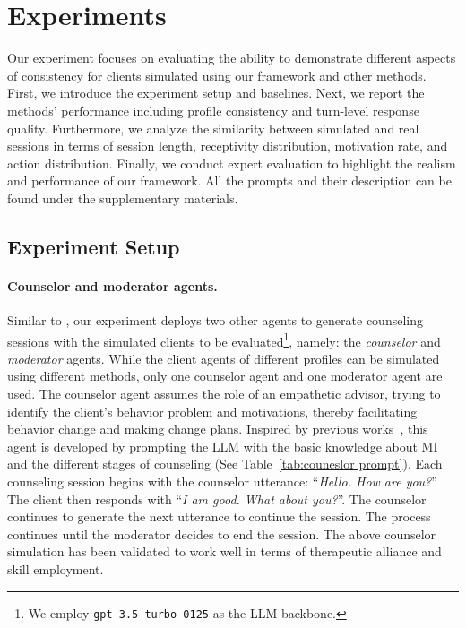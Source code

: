\section{Experiments}
\label{sec:experiments}

Our experiment focuses on evaluating the ability to demonstrate different aspects of consistency for clients simulated using our framework and other methods. First, we introduce the experiment setup and baselines. Next, we report the methods' performance including profile consistency and turn-level response quality. Furthermore, we analyze the similarity between simulated and real sessions in terms of session length, receptivity distribution, motivation rate, and action distribution. Finally, we conduct expert evaluation to highlight the realism and performance of our framework. All the prompts and their description can be found under the supplementary materials.

\subsection{Experiment Setup}
\label{sec:setting}

\paragraph{Counselor and moderator agents.}
Similar to \citet{tu2024towards}, our experiment deploys two other  agents to generate counseling sessions with the simulated clients to be evaluated\footnote{We employ \texttt{gpt-3.5-turbo-0125} as the LLM backbone.}, namely: the {\em  counselor} and {\em moderator} agents. 
While the client agents of different profiles can be simulated using different methods, only one counselor agent and one moderator agent are used. 
The counselor agent assumes the role of an empathetic advisor, trying to identify the client's behavior problem and motivations, thereby facilitating behavior change and making change plans.  Inspired by previous works~\citep{chiu2024computational,wang2024towards,yosef2024assessing}, this agent is developed by prompting the LLM with the basic knowledge about MI and the different stages of counseling (See Table~\ref{tab:couneslor prompt}).  Each counseling session begins with the counselor utterance: ``\textit{Hello. How are you?}'' The client then responds with ``\textit{I am good. What about you?}''. The counselor continues to generate the next utterance to continue the session. The process continues until the moderator decides to end the session.  The above counselor simulation has been validated to work well in terms of therapeutic alliance and skill employment.  

